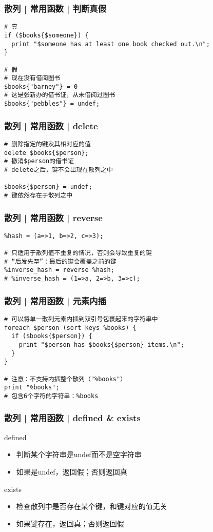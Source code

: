 \begin{frame}[fragile]
  \frametitle{散列 | \alert{常用函数} | 判断真假}
\begin{lstlisting}
# 真
if ($books{$someone}) {
  print "$someone has at least one book checked out.\n";
}

# 假
# 现在没有借阅图书
$books{"barney"} = 0
# 这是张新办的借书证，从未借阅过图书
$books{"pebbles"} = undef;
\end{lstlisting}
\end{frame}

\begin{frame}[fragile]
  \frametitle{散列 | \alert{常用函数} | delete}
\begin{lstlisting}
# 删除指定的键及其相对应的值
delete $books{$person};
# 撤消$person的借书证
# delete之后，键不会出现在散列之中

$books{$person} = undef;
# 键依然存在于散列之中
\end{lstlisting}
\end{frame}

\begin{frame}[fragile]
  \frametitle{散列 | \alert{常用函数} | reverse}
\begin{lstlisting}
%hash = (a=>1, b=>2, c=>3);

# 只适用于散列值不重复的情况，否则会导致重复的键
# “后发先至”：最后的键会覆盖之前的键
%inverse_hash = reverse %hash;
# %inverse_hash = (1=>a, 2=>b, 3=>c);
\end{lstlisting}
\end{frame}

\begin{frame}[fragile]
  \frametitle{散列 | \alert{常用函数} | 元素内插}
\begin{lstlisting}
# 可以将单一散列元素内插到双引号包裹起来的字符串中
foreach $person (sort keys %books) {
  if ($books{$person}) {
    print "$person has $books{$person} items.\n";
  }
}

# 注意：不支持内插整个散列（"%books"）
print "%books";
# 包含6个字符的字符串：%books
\end{lstlisting}
\end{frame}

\begin{frame}[fragile]
  \frametitle{散列 | \alert{常用函数} | defined \& exists}
  \begin{block}{defined}
    \begin{itemize}
      \item 判断某个字符串是undef而不是空字符串
      \item 如果是undef，返回假；否则返回真
    \end{itemize}
  \end{block}
  \pause
  \begin{block}{exists}
    \begin{itemize}
      \item 检查散列中是否存在某个键，和键对应的值无关
      \item 如果键存在，返回真；否则返回假
    \end{itemize}
  \end{block}
\end{frame}

